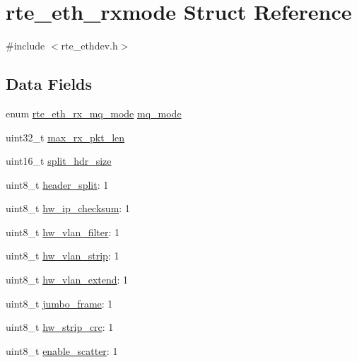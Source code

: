 \hypertarget{structrte__eth__rxmode}{}\section{rte\+\_\+eth\+\_\+rxmode Struct Reference}
\label{structrte__eth__rxmode}


{\ttfamily \#include $<$rte\+\_\+ethdev.\+h$>$}

\subsection*{Data Fields}
\begin{DoxyCompactItemize}
\item 
enum \hyperlink{rte__ethdev_8h_a586b8e86131b4ec0ccaf464e847ccf3e}{rte\+\_\+eth\+\_\+rx\+\_\+mq\+\_\+mode} \hyperlink{structrte__eth__rxmode_aa0562513c4569f1aa53050f1beac6b5d}{mq\+\_\+mode}
\item 
uint32\+\_\+t \hyperlink{structrte__eth__rxmode_a84a5d32306b86a1df884144612c70726}{max\+\_\+rx\+\_\+pkt\+\_\+len}
\item 
uint16\+\_\+t \hyperlink{structrte__eth__rxmode_a7aa0d86e260af96607d007c7361ab21e}{split\+\_\+hdr\+\_\+size}
\item 
uint8\+\_\+t \hyperlink{structrte__eth__rxmode_a151c3d1338430053f25c0ac18dae10fb}{header\+\_\+split}\+: 1
\item 
uint8\+\_\+t \hyperlink{structrte__eth__rxmode_a73042c1ac081c9f555cdc1a476485513}{hw\+\_\+ip\+\_\+checksum}\+: 1
\item 
uint8\+\_\+t \hyperlink{structrte__eth__rxmode_ad00939767eb266e18b7f5d87a993e3e8}{hw\+\_\+vlan\+\_\+filter}\+: 1
\item 
uint8\+\_\+t \hyperlink{structrte__eth__rxmode_a36ec224fb64ff42116b7d211ded782d1}{hw\+\_\+vlan\+\_\+strip}\+: 1
\item 
uint8\+\_\+t \hyperlink{structrte__eth__rxmode_a9de1179e78c4c97f398bcf945ffef7d8}{hw\+\_\+vlan\+\_\+extend}\+: 1
\item 
uint8\+\_\+t \hyperlink{structrte__eth__rxmode_a372e758c4721d73336631cc1e592ca23}{jumbo\+\_\+frame}\+: 1
\item 
uint8\+\_\+t \hyperlink{structrte__eth__rxmode_aea339586279530eadadaf36722346d93}{hw\+\_\+strip\+\_\+crc}\+: 1
\item 
uint8\+\_\+t \hyperlink{structrte__eth__rxmode_a35db2420233aa9f3f454a35d0a4f7f18}{enable\+\_\+scatter}\+: 1
\end{DoxyCompactItemize}



